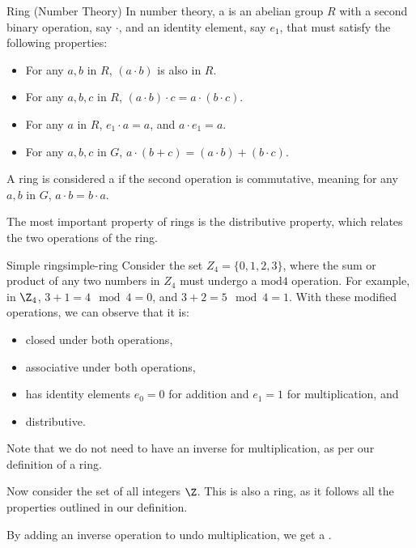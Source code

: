 \begin{dfnbox}{Ring (Number Theory)}{}
    In number theory, a  is an abelian group $R$ with a second binary operation, say $\cdot$, and an identity element, say $e_1$, that must satisfy the following properties:
    \begin{itemize}
        \item {} For any $a,b$ in $R$, $(a \cdot b)$ is also in $R$.
        \item {} For any $a,b,c$ in $R$, $(a \cdot b) \cdot c = a \cdot (b \cdot c)$.
        \item {} For any $a$ in $R$, $e_1 \cdot a = a$, and $a \cdot e_1 = a$.
        \item {} For any $a,b,c$ in $G$, $a \cdot (b + c) = (a \cdot b) + (b \cdot c)$.
    \end{itemize}
    A ring is considered a  if the second operation is commutative, meaning for any $a,b$ in $G$, $a \cdot b = b \cdot a$.
\end{dfnbox}

The most important property of rings is the distributive property, which relates the two operations of the ring.

\begin{exbox}{Simple ring}{simple-ring}
    Consider the set $Z_4 = \{0,1,2,3\}$, where the sum or product of any two numbers in $Z_4$ must undergo a $\text{mod} 4$ operation. For example, in $\Z_4$, $3+1 = 4 \mod 4 = 0$, and $3+2 = 5 \mod 4 = 1$. With these modified operations, we can observe that it is:
    \begin{itemize}
        \item closed under both operations,
        \item associative under both operations,
        \item has identity elements $e_0 = 0$ for addition and $e_1 = 1$ for multiplication, and
        \item distributive.
    \end{itemize}
    Note that we do not need to have an inverse for multiplication, as per our definition of a ring.

    Now consider the set of all integers $\Z$. This is also a ring, as it follows all the properties outlined in our definition.
\end{exbox}

By adding an inverse operation to undo multiplication, we get a .

